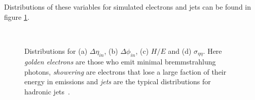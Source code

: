 Distributions of these variables for simulated electrons and jets can be found in figure \ref{FIGURE:PhysicsObjects_Electrons}. 

\begin{figure}[htp]%
\centering
{}\qquad
{}\\
\qquad
{}
\caption[Distributions for the variables $\Delta\eta_{\text in}$, $\Delta\phi_{\text in}$, $\sigma_{i\eta i\eta}$ and $H/E$ for simulated electrons and misidentified jets.]{Distributions for (a) $\Delta\eta_{in}$, (b) $\Delta\phi_{in}$, (c) $H/E$ and (d) $\sigma_{\eta\eta}$. Here \textit{golden electrons} are those who emit minimal bremmstrahlung photons, \textit{showering} are electrons that lose a large faction of their energy in emissions and \textit{jets} are the typical distributions for hadronic jets~\cite{ARTICLE:CMSElectronReconstruction}.}
\label{FIGURE:PhysicsObjects_Electrons}
\end{figure}

